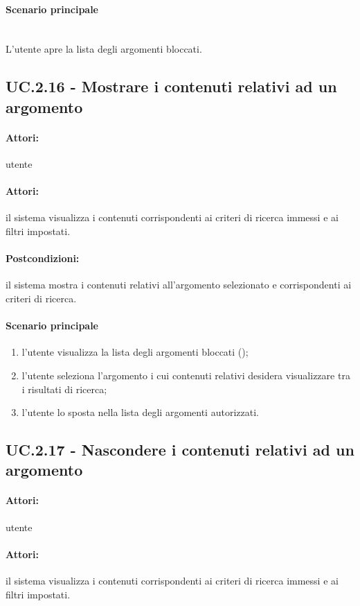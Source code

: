 \documentclass[10pt,a4paper,headinclude,footinclude,hidelinks]{scrreprt} %
\begin{document}
	\paragraph{Scenario principale} \hfill \\
	L'utente apre la lista degli argomenti bloccati.

	\subsection[UC.2.16]{UC.2.16 - Mostrare i contenuti relativi ad un argomento}
	\label{sec:stage:ar:uc:2_16}
	\paragraph{Attori:} utente
	\paragraph{Attori:} il sistema visualizza i contenuti corrispondenti ai criteri di ricerca immessi e ai filtri impostati.
	\paragraph{Postcondizioni:} il sistema mostra i contenuti relativi all'argomento selezionato e corrispondenti ai criteri di ricerca.
	\paragraph{Scenario principale}
	\begin{enumerate}
	\item l'utente visualizza la lista degli argomenti bloccati ();
	\item l'utente seleziona l'argomento i cui contenuti relativi desidera visualizzare tra i risultati di ricerca;
	\item l'utente lo sposta nella lista degli argomenti autorizzati.
	\end{enumerate}

	\subsection[UC.2.17]{UC.2.17 - Nascondere i contenuti relativi ad un argomento}
	\label{sec:stage:ar:uc:2_17}
	\paragraph{Attori:} utente
	\paragraph{Attori:} il sistema visualizza i contenuti corrispondenti ai criteri di ricerca immessi e ai filtri impostati.
\end{document}
